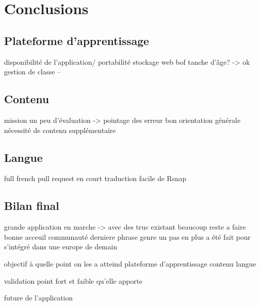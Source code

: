 \chapter{Conclusions}
\section{Plateforme d'apprentissage}
	disponibilité de l'application/ portabilité
	stockage web bof
	tanche d'âge? -> ok
	gestion de classe --
\section{Contenu}
	mission
		un peu d'évaluation -> pointage des erreur
		bon orientation générale
		nécessité de contenu supplémentaire
\section{Langue}
	full french
	pull request en court
	traduction facile de Rsnap
\section{Bilan final}
	grande application en marche -> avec des truc existant
	beaucoup reste a faire
	bonne acceuil
	communauté
	derniere phrase genre un pas en plus a été fait pour s'intégré dans une europe de demain






objectif à quelle point on les a atteind
	plateforme d'apprentissage
	contenu
	langue
	
validation 
	point fort et faible qu'elle apporte

future de l'application